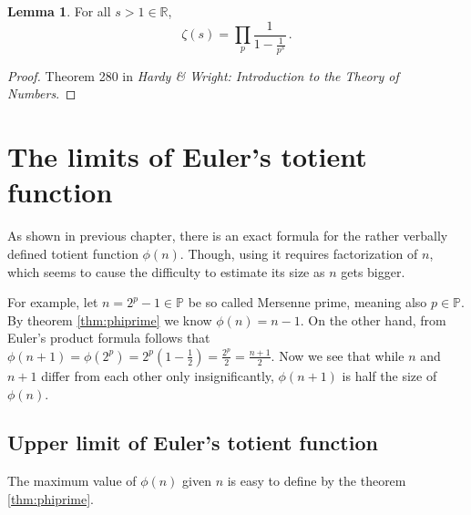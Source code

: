 \documentclass{article}
\theoremstyle{definition}
\newtheorem{lemma}[subsubsection]{Lemma}
\begin{document}
\begin{lemma}
\label{lemma:zeta}
For all $s>1\in\mathbb{R}$, 
\begin{equation*}
    \zeta(s)=\prod_p \frac{1}{1-\frac{1}{p^s}}\,.
\end{equation*}
\begin{proof}
Theorem 280 in \textit{Hardy \& Wright: Introduction to the Theory of Numbers}.
\end{proof}
\end{lemma}

\section{The limits of Euler's totient function}

As shown in previous chapter, there is an exact formula for the rather verbally defined totient function $\phi(n)$. Though, using it requires factorization of $n$, which seems to cause the difficulty to estimate its size as $n$ gets bigger.

For example, let $n = 2^p - 1 \in \mathbb{P}$ be so called Mersenne prime, meaning also $p \in \mathbb{P}$. By theorem \ref{thm:phiprime} we know $\phi(n) = n - 1$. On the other hand, from Euler's product formula follows that $\phi(n+1) = \phi(2^p) = 2^p(1-\frac{1}{2}) = \frac{2^p}{2} = \frac{n+1}{2}$. Now we see that while $n$ and $n+1$ differ from each other only insignificantly, $\phi(n+1)$ is half the size of $\phi(n)$.

\subsection{Upper limit of Euler's totient function}

The maximum value of $\phi(n)$ given $n$ is easy to define by the theorem \ref{thm:phiprime}.
\end{document}
